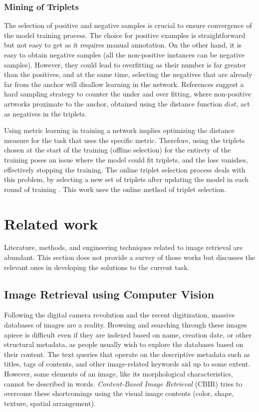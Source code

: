 \subsubsection{Mining of Triplets}

The selection of positive and negative samples is crucial to ensure convergence of the model training process. The choice for positive examples is straightforward but not easy to get as it requires manual annotation. On the other hand, it is easy to obtain negative samples (all the non-positive instances can be negative samples). However, they could lead to overfitting as their number is far greater than the positives, and at the same time, selecting the negatives that are already far from the anchor will disallow learning in the network. References \cite{Schroff2015FaceNetAU, SimoSerra2015DiscriminativeLO} suggest a hard sampling strategy to counter the under and over fitting, where non-positive artworks proximate to the anchor, obtained using the distance function \begin{math} dist \end{math}, act as negatives in the triplets.

Using metric learning in training a network implies optimizing the distance measure for the task that uses the specific metric. Therefore, using the triplets chosen at the start of the training (offline selection) for the entirety of the training poses an issue where the model could fit triplets, and the loss vanishes, effectively stopping the training. The online triplet selection process deals with this problem, by selecting a new set of triplets after updating the model in each round of training \cite{Schroff2015FaceNetAU}. This work uses the online method of triplet selection.

\section{Related work}\label{chap:2:related_work}

Literature, methods, and engineering techniques related to image retrieval are abundant. This section does not provide a survey of those works but discusses the relevant ones in developing the solutions to the current task.

\subsection{Image Retrieval using Computer Vision}

Following the digital camera revolution and the recent digitization, massive databases of images are a reality. Browsing and searching through these images apiece is difficult even if they are indexed based on name, creation date, or other structural metadata, as people usually wish to explore the databases based on their content. The text queries that operate on the descriptive metadata such as titles, tags of contents, and other image-related keywords aid up to some extent. However, some elements of an image, like its morphological characteristics, cannot be described in words. \emph{Content-Based Image Retrieval} (CBIR) tries to overcome these shortcomings using the visual image contents (color, shape, texture, spatial arrangement).

